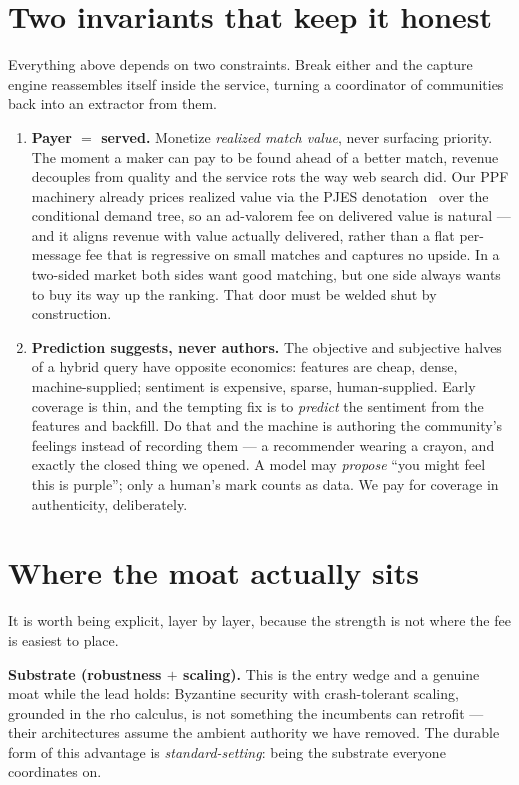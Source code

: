 \documentclass[11pt]{article}
\newcommand{\invariant}[1]{\textbf{\color{accent}#1}}
\begin{document}
\section{Two invariants that keep it honest}\label{sec:invariants}

Everything above depends on two constraints. Break either and the capture engine reassembles itself inside the service, turning a coordinator of communities back into an extractor from them.

\begin{enumerate}[leftmargin=1.4em, itemsep=8pt]
  \item \invariant{Payer $=$ served.} Monetize \emph{realized match value}, never surfacing priority. The moment a maker can pay to be found ahead of a better match, revenue decouples from quality and the service rots the way web search did. Our PPF machinery already prices realized value via the PJES denotation~\cite{pjes,finRho} over the conditional demand tree, so an ad-valorem fee on delivered value is natural --- and it aligns revenue with value actually delivered, rather than a flat per-message fee that is regressive on small matches and captures no upside. In a two-sided market both sides want good matching, but one side always wants to buy its way up the ranking. That door must be welded shut by construction.
  \item \invariant{Prediction suggests, never authors.} The objective and subjective halves of a hybrid query have opposite economics: features are cheap, dense, machine-supplied; sentiment is expensive, sparse, human-supplied. Early coverage is thin, and the tempting fix is to \emph{predict} the sentiment from the features and backfill. Do that and the machine is authoring the community's feelings instead of recording them --- a recommender wearing a crayon, and exactly the closed thing we opened. A model may \emph{propose} ``you might feel this is purple''; only a human's mark counts as data. We pay for coverage in authenticity, deliberately.
\end{enumerate}

\section{Where the moat actually sits}\label{sec:moat}

It is worth being explicit, layer by layer, because the strength is not where the fee is easiest to place.

\textbf{Substrate (robustness $+$ scaling).} This is the entry wedge and a genuine moat while the lead holds: Byzantine security with crash-tolerant scaling, grounded in the rho calculus, is not something the incumbents can retrofit --- their architectures assume the ambient authority we have removed. The durable form of this advantage is \emph{standard-setting}: being the substrate everyone coordinates on.
\end{document}
